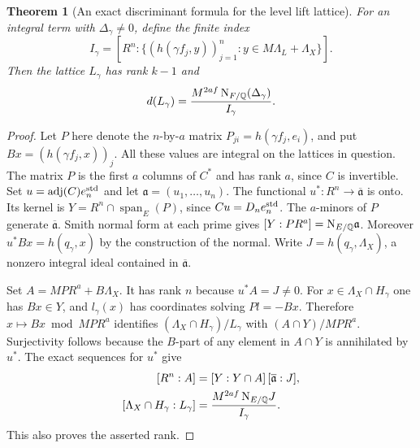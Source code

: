 \documentclass[a4paper,11pt]{article}
\newtheorem{theorem}[proposition]{Theorem}
\theoremstyle{definition}
\theoremstyle{remark}
\numberwithin{equation}{section}
\begin{document}
\begin{theorem}[An exact discriminant formula for the level lift lattice]
\leavevmode\label{thm:termdisc687}
For an integral term with \(\Delta_\gamma\ne0\), define the
finite index
\[
 I_\gamma=[R^n:\{(h(\gamma f_j,y))_{j=1}^n:
                         y\in M\Lambda_L+\Lambda_X\}].
\]
Then the lattice \(L_\gamma\) has rank \(k-1\) and
\[
                  d(L_\gamma)
              =\frac{M^{2af}\,{\rm N}_{F/\mathbb Q}(\Delta_\gamma)}
                       {I_\gamma}.
\]
\end{theorem}
\begin{proof}
Let \(P\) here denote the \(n\)-by-\(a\) matrix
\(P_{ji}=h(\gamma f_j,e_i)\), and put
\(B x=(h(\gamma f_j,x))_j\). All these values are integral on
the lattices in question. The matrix \(P\) is the first \(a\)
columns of \(C^*\) and has rank \(a\), since \(C\) is
invertible. Set \(u=\operatorname{adj}(C)e_n^{\rm std}\) and
let \(\mathfrak a=(u_1,\ldots,u_n)\). The functional
\(u^*:R^n\to\overline{\mathfrak a}\) is onto. Its kernel is
\(Y=R^n\cap\operatorname{span}_E(P)\), since \(Cu=D_n e_n^{\rm std}\).
The \(a\)-minors of \(P\) generate \(\overline{\mathfrak a}\).
Smith normal form at each prime gives
\([Y:PR^a]={\rm N}_{E/\mathbb Q}\mathfrak a\).
Moreover \(u^*B x=h(q_\gamma,x)\) by the construction of the
normal. Write \(J=h(q_\gamma,\Lambda_X)\), a nonzero integral
ideal contained in \(\overline{\mathfrak a}\).

Set \(A=MPR^a+B\Lambda_X\). It has rank \(n\) because
\(u^*A=J\ne0\). For \(x\in\Lambda_X\cap H_\gamma\) one has
\(B x\in Y\), and \(l_\gamma(x)\) has coordinates solving
\(P l=-Bx\). Therefore \(x\mapsto Bx\bmod MPR^a\) identifies
\((\Lambda_X\cap H_\gamma)/L_\gamma\) with
\((A\cap Y)/MPR^a\). Surjectivity follows because the
\(B\)-part of any element in \(A\cap Y\) is annihilated by
\(u^*\). The exact sequences for \(u^*\) give
\[
 \begin{split}
 [R^n:A]&=[Y:Y\cap A]\,[\overline{\mathfrak a}:J],\\
 [\Lambda_X\cap H_\gamma:L_\gamma]
     &=\frac{M^{2af}\,{\rm N}_{E/\mathbb Q}J}{I_\gamma}.
 \end{split}
\]
This also proves the asserted rank.


\end{proof}
\end{document}
